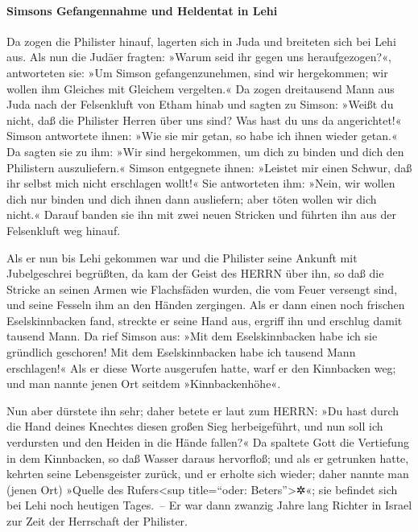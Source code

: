 \hypertarget{simsons-gefangennahme-und-heldentat-in-lehi}{%
\paragraph{Simsons Gefangennahme und Heldentat in
Lehi}\label{simsons-gefangennahme-und-heldentat-in-lehi}}

Da zogen die Philister hinauf, lagerten sich in Juda und
breiteten sich bei Lehi aus. Als nun die Judäer fragten:
»Warum seid ihr gegen uns heraufgezogen?«, antworteten sie: »Um Simson
gefangenzunehmen, sind wir hergekommen; wir wollen ihm Gleiches mit
Gleichem vergelten.« Da zogen dreitausend Mann aus Juda
nach der Felsenkluft von Etham hinab und sagten zu Simson: »Weißt du
nicht, daß die Philister Herren über uns sind? Was hast du uns da
angerichtet!« Simson antwortete ihnen: »Wie sie mir getan, so habe ich
ihnen wieder getan.« Da sagten sie zu ihm: »Wir sind
hergekommen, um dich zu binden und dich den Philistern auszuliefern.«
Simson entgegnete ihnen: »Leistet mir einen Schwur, daß ihr selbst mich
nicht erschlagen wollt!« Sie antworteten ihm: »Nein, wir
wollen dich nur binden und dich ihnen dann ausliefern; aber töten wollen
wir dich nicht.« Darauf banden sie ihn mit zwei neuen Stricken und
führten ihn aus der Felsenkluft weg hinauf.

Als er nun bis Lehi gekommen war und die Philister seine
Ankunft mit Jubelgeschrei begrüßten, da kam der Geist des HERRN über
ihn, so daß die Stricke an seinen Armen wie Flachsfäden wurden, die vom
Feuer versengt sind, und seine Fesseln ihm an den Händen zergingen.
Als er dann einen noch frischen Eselskinnbacken fand,
streckte er seine Hand aus, ergriff ihn und erschlug damit tausend Mann.
Da rief Simson aus: »Mit dem Eselskinnbacken habe ich sie
gründlich geschoren! Mit dem Eselskinnbacken habe ich tausend Mann
erschlagen!« Als er diese Worte ausgerufen hatte, warf er
den Kinnbacken weg; und man nannte jenen Ort seitdem »Kinnbackenhöhe«.

Nun aber dürstete ihn sehr; daher betete er laut zum
HERRN: »Du hast durch die Hand deines Knechtes diesen großen Sieg
herbeigeführt, und nun soll ich verdursten und den Heiden in die Hände
fallen?« Da spaltete Gott die Vertiefung in dem
Kinnbacken, so daß Wasser daraus hervorfloß; und als er getrunken hatte,
kehrten seine Lebensgeister zurück, und er erholte sich wieder; daher
nannte man (jenen Ort) »Quelle des Rufers\textless sup title=``oder:
Beters''\textgreater✲«; sie befindet sich bei Lehi noch heutigen
Tages.~-- Er war dann zwanzig Jahre lang Richter in
Israel zur Zeit der Herrschaft der Philister.

